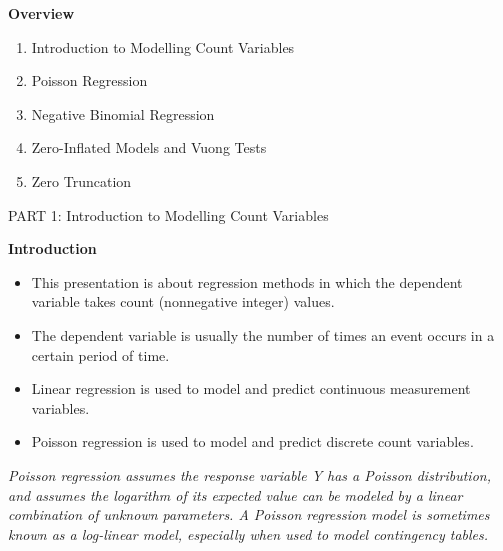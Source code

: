 \documentclass[MASTER.tex]{subfiles}
\begin{document}
\begin{frame}
\Large
\noindent \textbf{Overview}
\begin{enumerate}
\item Introduction to Modelling Count Variables
\item Poisson Regression
\item Negative Binomial Regression
\item Zero-Inflated Models and Vuong Tests
\item Zero Truncation
\end{enumerate}

\end{frame}
\begin{frame}
	
	{\LARGE
		PART 1:	Introduction to Modelling Count Variables
	} \bigskip
	\Large


\end{frame}
\begin{frame}
	\Large
\textbf{Introduction}
\begin{itemize}
\item This presentation is about regression methods in which the dependent variable takes
 count (nonnegative integer) values. \smallskip \item The dependent variable is usually the number of times an event occurs in a certain period of time.
\end{itemize}
\end{frame}
\begin{frame}[fragile]
\large
	\begin{itemize}
		\item Linear regression is used to model and predict continuous measurement variables.
		\item Poisson regression is used to model and predict discrete count variables.
	\end{itemize}
	\textit{Poisson regression assumes the response variable Y has a Poisson distribution, and assumes the logarithm of its expected value can be modeled by a linear combination of unknown parameters. A Poisson regression model is sometimes known as a log-linear model, especially when used to model contingency tables.}
	
\end{frame}
\end{document}
